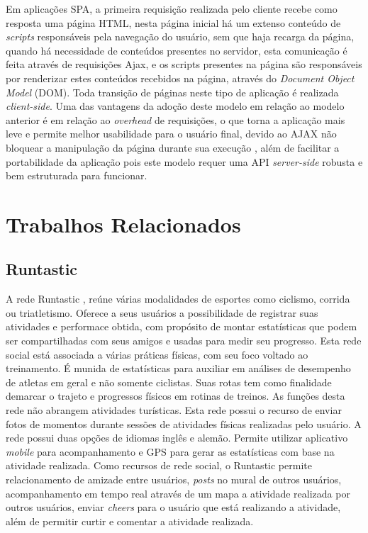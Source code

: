 Em aplicações SPA, a primeira requisição realizada pelo cliente recebe como resposta uma página HTML, nesta página inicial há um extenso conteúdo de
\textit{scripts} responsáveis pela navegação do usuário, sem que haja recarga da página, quando há necessidade de conteúdos presentes no servidor, 
esta comunicação é feita através de requisições Ajax, e os scripts presentes na página são responsáveis por renderizar estes conteúdos recebidos na
página, através do \textit{Document Object Model} (DOM). Toda transição de páginas neste tipo de aplicação é realizada \textit{client-side}. 
Uma das vantagens da adoção deste modelo em relação ao modelo anterior é em relação ao \textit{overhead} de requisições, o que torna a aplicação 
mais leve e permite melhor usabilidade para o usuário final, devido ao AJAX não bloquear a manipulação da página durante sua execução \cite{spa01}, 
além de facilitar a portabilidade da aplicação pois este modelo requer uma API \textit{server-side} robusta e bem estruturada para funcionar.

\section{\esp Trabalhos Relacionados}
\subsection{Runtastic}
A rede Runtastic \cite{runtastic}, reúne várias modalidades de esportes como ciclismo, corrida ou triatletismo. Oferece a seus usuários a
possibilidade de registrar suas atividades e performace obtida, com propósito de montar estatísticas que podem ser compartilhadas com seus amigos e
usadas para medir seu progresso. Esta rede social está associada a várias práticas físicas, com seu foco voltado ao treinamento. É munida de 
estatísticas para auxiliar em análises de desempenho de atletas em geral e não somente ciclistas. Suas rotas tem como finalidade demarcar o trajeto 
e progressos físicos em rotinas de treinos. As funções desta rede não abrangem atividades turísticas. Esta rede possui o recurso de enviar fotos de 
momentos durante sessões de atividades físicas realizadas pelo usuário. A rede  possui duas opções de idiomas inglês e alemão. Permite utilizar 
aplicativo \textit{mobile} para acompanhamento e GPS para gerar as estatísticas com base na atividade realizada. Como recursos de rede social, o 
Runtastic permite relacionamento de amizade entre usuários, \textit{posts} no mural de outros usuários, acompanhamento em tempo real através de um 
mapa a  atividade realizada por outros usuários, enviar \textit{cheers} para o usuário que está realizando a atividade, além de permitir curtir e 
comentar a atividade realizada. 

